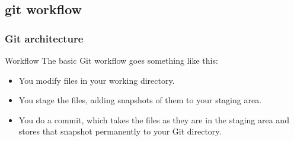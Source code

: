 \documentclass{beamer}
\begin{document}
\subsection{git workflow}
\begin{frame}
\frametitle{Git architecture}

\begin{block}{Workflow}
\text The basic Git workflow goes something like this: 
\begin{itemize}
 \item You modify files in your working directory.
 \item You stage the files, adding snapshots of them to your staging area.
 \item You do a commit, which takes the files as they are in the staging area and stores that snapshot permanently to your Git directory. 
\end{itemize}

\end{block}
\end{frame}
\end{document}
